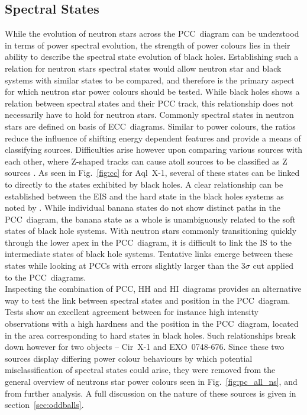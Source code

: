 \subsection{Spectral States}
\label{sec:dis_states}
While the evolution of neutron stars across the \ac{PCC}~diagram can be understood in terms of power spectral evolution, the strength of power colours lies in their ability to describe the spectral state evolution of black holes. Establishing such a relation for neutron stars spectral states would allow neutron star and black systems with similar states to be compared, and therefore is the primary aspect for which neutron star power colours should be tested. While black holes shows a relation between spectral states and their \ac{PCC} track, this relationship does not necessarily have to hold for neutron stars. Commonly spectral states in neutron stars are defined on basis of \ac{ECC}~diagrams. Similar to power colours, the ratios reduce the influence of shifting energy dependent features and provide a means of classifying sources. Difficulties arise however upon comparing various sources with each other, where Z-shaped tracks can cause atoll sources to be classified as Z sources \citep[see][]{muno2002z,gierlinski2002comment}. As seen in Fig.~\ref{fig:cc} for Aql~X-1, several of these states can be linked to directly to the states exhibited by black holes. A clear relationship can be established between the \ac{EIS} and the hard state in the black holes systems as noted by \citet{van1994similarities}. While individual banana states do not show distinct paths in the \ac{PCC}~diagram, the banana state as a whole is unambiguously related to the soft states of black hole systems. With neutron stars commonly transitioning quickly through the lower apex in the \ac{PCC}~diagram, it is difficult to link the \ac{IS} to the intermediate states of black hole systems. Tentative links emerge between these states while looking at \acp{PCC} with errors slightly larger than the $3\sigma$ cut applied to the \ac{PCC}~diagrams.\\

Inspecting the combination of \ac{PCC}, \ac{HH} and \ac{HI}~diagrams provides an alternative way to test the link between spectral states and position in the \ac{PCC}~diagram. Tests show an excellent agreement between for instance high intensity observations with a high hardness and the position in the \ac{PCC}~diagram, located in the area corresponding to hard states in black holes. Such relationships break down however for two objects -- Cir~X-1 and EXO~0748-676. Since these two sources display differing power colour behaviours by which potential misclassification of spectral states could arise, they were removed from the general overview of neutrons star power colours seen in Fig.~\ref{fig:pc_all_ns}, and from further analysis. A full discussion on the nature of these sources is given in section~\ref{sec:oddballs}.\\

